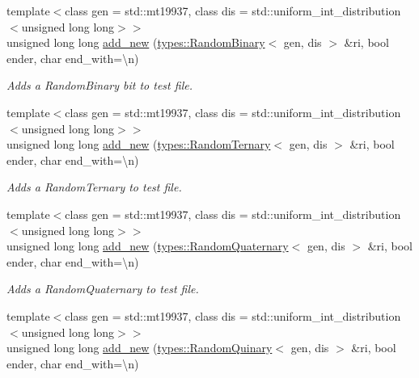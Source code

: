 \begin{DoxyCompactItemize}
{\footnotesize template$<$class gen  = std\+::mt19937, class dis  = std\+::uniform\+\_\+int\+\_\+distribution$<$unsigned long long$>$$>$ }\\unsigned long long \mbox{\hyperlink{classtestcaser_1_1maker_1_1TestCaseBuilder_aa836b9013397e6865e0a438885f3eacc}{add\+\_\+new}} (\mbox{\hyperlink{structtestcaser_1_1maker_1_1types_1_1RandomBinary}{types\+::\+Random\+Binary}}$<$ gen, dis $>$ \&ri, bool ender, char end\+\_\+with=\textquotesingle{}\textbackslash{}n\textquotesingle{})
\begin{DoxyCompactList}\small\item\em Adds a Random\+Binary bit to test file. \end{DoxyCompactList}\item 
{\footnotesize template$<$class gen  = std\+::mt19937, class dis  = std\+::uniform\+\_\+int\+\_\+distribution$<$unsigned long long$>$$>$ }\\unsigned long long \mbox{\hyperlink{classtestcaser_1_1maker_1_1TestCaseBuilder_a79bbb00c54cfbb7f146167dfe4fc5d0e}{add\+\_\+new}} (\mbox{\hyperlink{structtestcaser_1_1maker_1_1types_1_1RandomTernary}{types\+::\+Random\+Ternary}}$<$ gen, dis $>$ \&ri, bool ender, char end\+\_\+with=\textquotesingle{}\textbackslash{}n\textquotesingle{})
\begin{DoxyCompactList}\small\item\em Adds a Random\+Ternary to test file. \end{DoxyCompactList}\item 
{\footnotesize template$<$class gen  = std\+::mt19937, class dis  = std\+::uniform\+\_\+int\+\_\+distribution$<$unsigned long long$>$$>$ }\\unsigned long long \mbox{\hyperlink{classtestcaser_1_1maker_1_1TestCaseBuilder_a1ff26e8762e0fa761d8cb322b781a920}{add\+\_\+new}} (\mbox{\hyperlink{structtestcaser_1_1maker_1_1types_1_1RandomQuaternary}{types\+::\+Random\+Quaternary}}$<$ gen, dis $>$ \&ri, bool ender, char end\+\_\+with=\textquotesingle{}\textbackslash{}n\textquotesingle{})
\begin{DoxyCompactList}\small\item\em Adds a Random\+Quaternary to test file. \end{DoxyCompactList}\item 
{\footnotesize template$<$class gen  = std\+::mt19937, class dis  = std\+::uniform\+\_\+int\+\_\+distribution$<$unsigned long long$>$$>$ }\\unsigned long long \mbox{\hyperlink{classtestcaser_1_1maker_1_1TestCaseBuilder_ab2020617697ce29f2569d95bd8b92c1a}{add\+\_\+new}} (\mbox{\hyperlink{structtestcaser_1_1maker_1_1types_1_1RandomQuinary}{types\+::\+Random\+Quinary}}$<$ gen, dis $>$ \&ri, bool ender, char end\+\_\+with=\textquotesingle{}\textbackslash{}n\textquotesingle{})

\end{DoxyCompactItemize}
